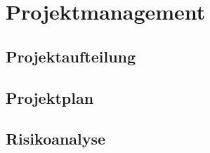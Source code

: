 \clearpage
\section{Projektmanagement}\label{sec:Projektmanagement}




\subsection{Projektaufteilung}\label{subsec:Projektaufteilung}


\subsection{Projektplan}\label{subsec:Projektplan}



\subsection{Risikoanalyse}\label{subsec:Risikoanalyse}

